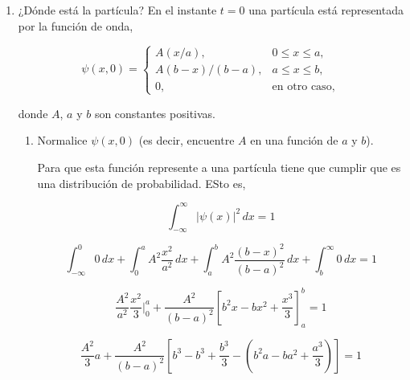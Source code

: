 \documentclass[12pt,a4paper]{article}
\begin{document}
\begin{enumerate}
\begin{enumerate}
Cuando $ x \leftarrow \infty, \, -\infty $ entonces $ \psi, \, \phi \leftarrow 0 $ por lo que 

\[
\braket{\psi|\hat{p}_{x}|\phi} = -i\hslash\left( - \int_{-\infty}^{\infty} \frac{d}{dx}[\psi^{*}] \phi \, dx \right)
\]

\[
\braket{\psi|\hat{\frac{\partial }{\partial }}_{x}|\phi} = i\hslash\int_{-\infty}^{\infty} \frac{d}{dx}[\psi^{*}] \phi \, dx
\]

Nótese que, $ \phi = \bra{\phi}^{*}$ y que $ i\hslash\frac{d}{dx}[\psi^{*}] = \left( - i\hslash\frac{d}{dx}[\psi] \right)^{*} = \left( \hat{p}_x \ket{\psi} \right)^{*}$

por lo que,

\[
\braket{\psi|\hat{p}_{x}|\phi} = \braket{\phi|\hat{p}_{x}|\psi}^{*} 
\]

finalmente el operador si es Hermitiano.

\end{enumerate}

\item ¿Dónde está la partícula?
En el instante $ t = 0 $ una partícula está representada por la función de onda,

\[
\psi(x,0) = \begin{cases}
A(x/a), & 0 \leq x \leq a, \\
A(b-x)/(b-a), & a \leq x \leq b, \\
0, & \mathrm{en \,\, otro \,\, caso,}
\end{cases}
\]

donde $ A $, $ a $ y $ b $ son constantes positivas.

\begin{enumerate}
\item Normalice $ \psi(x,0) $ (es decir, encuentre $ A $ en una función de $ a $ y $ b $).

Para que esta función represente a una partícula tiene que cumplir que es una distribución de probabilidad. ESto es,

\[
\int_{-\infty}^{\infty} |\psi(x)|^{2} \, dx = 1
\]

\[
\int_{-\infty}^{0} 0 \, dx + \int_{0}^{a} A^{2}\frac{x^{2}}{a^{2}}  \, dx + \int_{a}^{b} A^{2}\frac{(b-x)^{2}}{(b-a)^{2}} \, dx + \int_{b}^{\infty} 0 \, dx = 1
\]

\[
\frac{A^{2}}{a^{2}}\frac{x^{2}}{3}\bigg |_{0}^{a} + \frac{A^{2}}{(b-a)^{2}} \left[ b^{2}x-bx^{2}+\frac{x^{3}}{3} \right]_{a}^{b} = 1
\]

\[
\frac{A^{2}}{3}a + \frac{A^{2}}{(b-a)^{2}} \left[ b^{3}-b^{3}+\frac{b^{3}}{3}- \left( b^{2}a-ba^{2}+\frac{a^{3}}{3} \right) \right] = 1
\]


\end{enumerate}
\end{enumerate}
\end{document}
